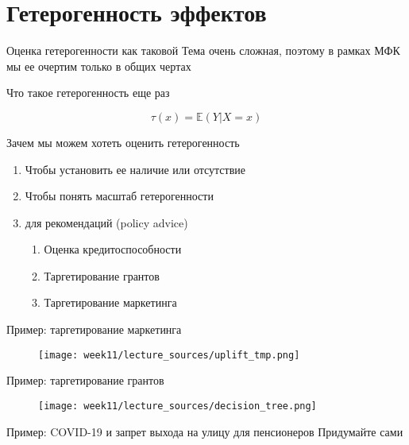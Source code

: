 \documentclass[12pt]{beamer}
\begin{document}
\section{Гетерогенность эффектов}

\begin{frame}{Оценка гетерогенности как таковой}
Тема очень сложная, поэтому в рамках МФК мы ее очертим только в общих чертах

Что такое гетерогенность еще раз

$$
\tau(x) = \mathbb{E}(Y|X=x)
$$

Зачем мы можем хотеть оценить гетерогенность

\begin{enumerate}
    \item Чтобы установить ее наличие или отсутствие
    \item Чтобы понять масштаб гетерогенности
    \item для рекомендаций (policy advice)
    \begin{enumerate}
        \item Оценка кредитоспособности
        \item Таргетирование грантов
        \item Таргетирование маркетинга
    \end{enumerate}
\end{enumerate}
\end{frame}

\begin{frame}{Пример: таргетирование маркетинга}
\begin{figure}
    \centering
    \texttt{[image: week11/lecture\_sources/uplift\_tmp.png]}
\end{figure}
\end{frame}

\begin{frame}{Пример: таргетирование грантов}
\begin{figure}
    \centering
    \texttt{[image: week11/lecture\_sources/decision\_tree.png]}
\end{figure}
\end{frame}

\begin{frame}{Пример: COVID-19 и запрет выхода на улицу для пенсионеров}
Придумайте сами
\end{frame}

    
\end{document}
